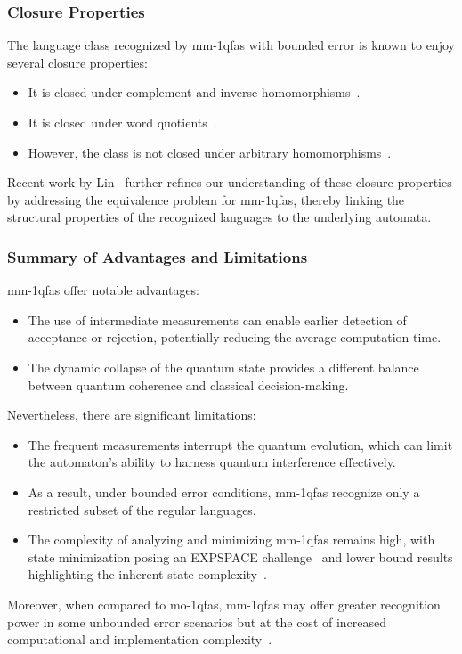 \subsubsection{Closure Properties}
The language class recognized by \gls{mm-1qfa}s with bounded error is known to enjoy several closure properties:
\begin{itemize}
    \item It is closed under complement and inverse homomorphisms~\cite{brodsky2002characterizations}.
    \item It is closed under word quotients~\cite{brodsky2002characterizations}.
    \item However, the class is not closed under arbitrary homomorphisms~\cite{646094,10.1007/3-540-45007-6_1}.
\end{itemize}
Recent work by Lin~\cite{LIN2012807} further refines our understanding of these closure properties by addressing the equivalence problem for \gls{mm-1qfa}s, thereby linking the structural properties of the recognized languages to the underlying automata.

\subsubsection{Summary of Advantages and Limitations}
\gls{mm-1qfa}s offer notable advantages:
\begin{itemize}
    \item The use of intermediate measurements can enable earlier detection of acceptance or rejection, potentially reducing the average computation time.
    \item The dynamic collapse of the quantum state provides a different balance between quantum coherence and classical decision-making.
\end{itemize}
Nevertheless, there are significant limitations:
\begin{itemize}
    \item The frequent measurements interrupt the quantum evolution, which can limit the automaton’s ability to harness quantum interference effectively.
    \item As a result, under bounded error conditions, \gls{mm-1qfa}s recognize only a restricted subset of the regular languages.
    \item The complexity of analyzing and minimizing \gls{mm-1qfa}s remains high, with state minimization posing an EXPSPACE challenge~\cite{MATEUS201236} and lower bound results highlighting the inherent state complexity~\cite{10.1007/3-540-44612-5_9}.
\end{itemize}
Moreover, when compared to \gls{mo-1qfa}s, \gls{mm-1qfa}s may offer greater recognition power in some unbounded error scenarios but at the cost of increased computational and implementation complexity~\cite{646094,10.1007/3-540-44669-9_10}.

